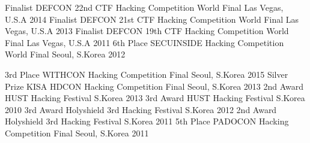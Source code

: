     \begin{cvhonors}
      \cvhonor
        {Finalist}
        {DEFCON 22nd CTF Hacking Competition World Final}
        {Las Vegas, U.S.A}
        {2014}
      \cvhonor
        {Finalist}
        {DEFCON 21st CTF Hacking Competition World Final}
        {Las Vegas, U.S.A}
        {2013}
      \cvhonor
        {Finalist}
        {DEFCON 19th CTF Hacking Competition World Final}
        {Las Vegas, U.S.A}
        {2011}
      \cvhonor
        {6th Place}
        {SECUINSIDE Hacking Competition World Final}
        {Seoul, S.Korea}
        {2012}
    \end{cvhonors}

    \begin{cvhonors}
      \cvhonor
        {3rd Place}
        {WITHCON Hacking Competition Final}
        {Seoul, S.Korea}
        {2015}
      \cvhonor
        {Silver Prize}
        {KISA HDCON Hacking Competition Final}
        {Seoul, S.Korea}
        {2013}
      \cvhonor
        {2nd Award}
        {HUST Hacking Festival}
        {S.Korea}
        {2013}
      \cvhonor
        {3rd Award}
        {HUST Hacking Festival}
        {S.Korea}
        {2010}
      \cvhonor
        {3rd Award}
        {Holyshield 3rd Hacking Festival}
        {S.Korea}
        {2012}
      \cvhonor
        {2nd Award}
        {Holyshield 3rd Hacking Festival}
        {S.Korea}
        {2011}
      \cvhonor
        {5th Place}
        {PADOCON Hacking Competition Final}
        {Seoul, S.Korea}
        {2011}
    \end{cvhonors}
